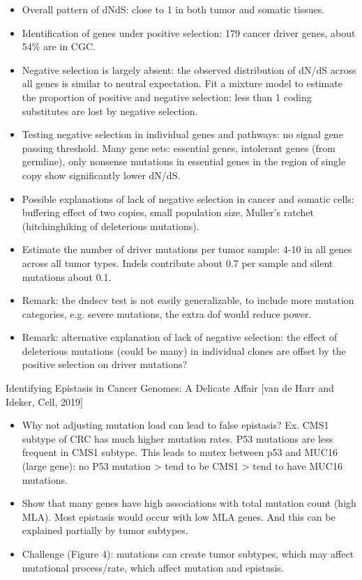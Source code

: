 \documentclass{report}
\begin{document}
\begin{itemize}
	\item Overall pattern of dNdS: close to 1 in both tumor and somatic tissues. 
	
	\item Identification of genes under positive selection: 179 cancer driver genes, about 54\% are in CGC. 
	
	\item Negative selection is largely absent: the observed distribution of dN/dS across all genes is similar to neutral expectation. Fit a mixture model to estimate the proportion of positive and negative selection: less than 1 coding substitutes are lost by negative selection.
	
	\item Testing negative selection in individual genes and pathways: no signal gene passing threshold. Many gene sets: essential genes, intolerant genes (from germline), only nonsense mutations in essential genes in the region of single copy show significantly lower dN/dS. 
	
	\item Possible explanations of lack of negative selection in cancer and somatic cells: buffering effect of two copies, small population size, Muller’s ratchet (hitchinghiking of deleterious mutations). 
	
	\item Estimate the number of driver mutations per tumor sample: 4-10 in all genes across all tumor types. Indels contribute about 0.7 per sample and silent mutations about 0.1. 
	
	\item Remark: the dndscv test is not easily generalizable, to include more mutation categories, e.g. severe mutations, the extra dof would reduce power. 
	
	\item Remark: alternative explanation of lack of negative selection: the effect of deleterious mutations (could be many) in individual clones are offset by the positive selection on driver mutations? 
\end{itemize}

Identifying Epistasis in Cancer Genomes: A Delicate Affair [van de Harr and Ideker, Cell, 2019]
\begin{itemize}
	\item Why not adjusting mutation load can lead to false epistasis? Ex. CMS1 subtype of CRC has much higher mutation rates. P53 mutations are less frequent in CMS1 subtype. This leads to mutex between p53 and MUC16 (large gene): no P53 mutation > tend to be CMS1 > tend to have MUC16 mutations.
	
	\item Show that many genes have high associations with total mutation count (high MLA). Most epistasis would occur with low MLA genes. And this can be explained partially by tumor subtypes.
	
	\item Challenge (Figure 4): mutations can create tumor subtypes, which may affect mutational process/rate, which affect mutation and epistasis.
\end{itemize}
\end{document}
